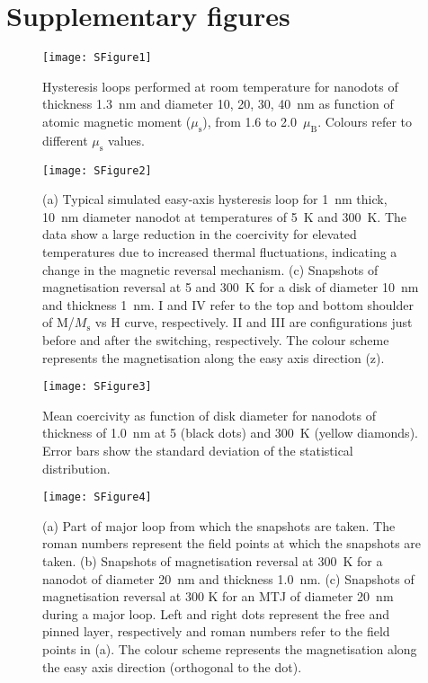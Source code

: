 \documentclass[aps,prb,signlecolumn,preprint,superscriptaddress,10]{revtex4-1}
\newcommand{\smmu}{\ensuremath{\mu_{\mathrm{s}}}\xspace}
\newcommand{\muB}{\ensuremath{\mu_{\mathrm{B}}}\xspace}
\newcommand{\Mags}{\ensuremath{M_{\mathrm{s}}}\xspace}
\begin{document}
\section*{Supplementary figures}
\begin{figure}[!hb]
	\centering
	\texttt{[image: SFigure1]}
	\caption{Hysteresis loops performed at room temperature for nanodots of thickness 1.3~nm and diameter 10, 20, 30, 40~nm as function of atomic magnetic moment (\smmu), from 1.6 to 2.0~\muB. Colours refer to different \smmu values.}
	\label{fig:SFigure1}
\end{figure}

\begin{figure}[!tb]
	\centering
	\texttt{[image: SFigure2]}
	\caption{(a) Typical simulated easy-axis hysteresis loop for 1~nm thick, 10~nm diameter nanodot at temperatures of 5~K and 300~K. The data show a large reduction in the coercivity for elevated temperatures due to increased thermal fluctuations, indicating a change in the magnetic reversal mechanism. (c) Snapshots of magnetisation reversal at 5 and 300~K for a disk of diameter 10~nm and thickness 1~nm. I and IV refer to the top and bottom shoulder of M/\Mags vs H curve, respectively. II and III are configurations just before and after the switching, respectively. The colour scheme represents the magnetisation along the easy axis direction (z).}
	\label{fig:SFigure2}
\end{figure}

\begin{figure}[!tb]
	\centering
	\texttt{[image: SFigure3]}
	\caption{Mean coercivity as function of disk diameter for nanodots of thickness of 1.0~nm at 5 (black dots) and 300~K (yellow diamonds). Error bars show the standard deviation of the statistical distribution.}
	\label{fig:SFigure3}
\end{figure}

\begin{figure}[!tb]
	\centering
	\texttt{[image: SFigure4]}
	\caption{(a) Part of major loop from which the snapshots are taken. The roman numbers represent the field points at which the snapshots are taken. (b) Snapshots of magnetisation reversal at 300~K for a nanodot of diameter 20~nm and thickness 1.0~nm. (c) Snapshots of magnetisation reversal at 300 K for an MTJ of diameter 20~nm during a major loop. Left and right dots represent the free and pinned layer, respectively and roman numbers refer to the field points in (a). The colour scheme represents the magnetisation along the easy axis direction (orthogonal to the dot).}
	\label{fig:SFigure4}
\end{figure}
\end{document}
